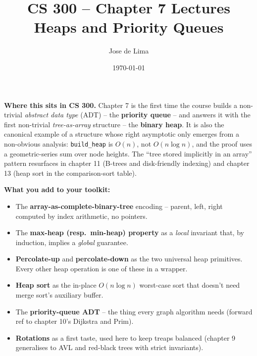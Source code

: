 \documentclass[11pt]{article}
\title{CS 300 -- Chapter 7 Lectures\\\large Heaps and Priority Queues}
\author{Jose de Lima}
\date{\today}
\begin{document}
\maketitle

\begin{ideabox}
\textbf{Where this sits in CS 300.} Chapter 7 is the first time the course
builds a non-trivial \emph{abstract data type} (ADT) -- the
\textbf{priority queue} -- and answers it with the first non-trivial
\emph{tree-as-array} structure -- the \textbf{binary heap}. It is also
the canonical example of a structure whose right asymptotic only emerges
from a non-obvious analysis: \texttt{build\_heap} is $O(n)$, not
$O(n \log n)$, and the proof uses a geometric-series sum over node
heights. The ``tree stored implicitly in an array'' pattern resurfaces
in chapter 11 (B-trees and disk-friendly indexing) and chapter 13
(heap sort in the comparison-sort table).

\textbf{What you add to your toolkit:}
\begin{itemize}
    \item The \textbf{array-as-complete-binary-tree} encoding -- parent,
          left, right computed by index arithmetic, no pointers.
    \item The \textbf{max-heap (resp.\ min-heap) property} as a
          \emph{local} invariant that, by induction, implies a
          \emph{global} guarantee.
    \item \textbf{Percolate-up} and \textbf{percolate-down} as the two
          universal heap primitives. Every other heap operation is one
          of these in a wrapper.
    \item \textbf{Heap sort} as the in-place $O(n \log n)$ worst-case
          sort that doesn't need merge sort's auxiliary buffer.
    \item The \textbf{priority-queue ADT} -- the thing every graph
          algorithm needs (forward ref to chapter 10's Dijkstra and
          Prim).
    \item \textbf{Rotations} as a first taste, used here to keep
          treaps balanced (chapter 9 generalises to AVL and red-black
          trees with strict invariants).
\end{itemize}


\end{ideabox}
\end{document}
